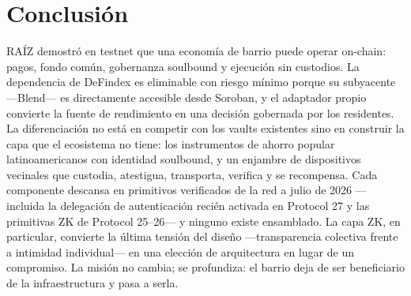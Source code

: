 \documentclass[twocolumn,10pt]{article}
\begin{document}
\section{Conclusi\'on}

RA\'IZ demostr\'o en testnet que una econom\'ia de barrio puede operar on-chain: pagos, fondo com\'un, gobernanza soulbound y ejecuci\'on sin custodios. La dependencia de DeFindex es eliminable con riesgo m\'inimo porque su subyacente ---Blend--- es directamente accesible desde Soroban, y el adaptador propio convierte la fuente de rendimiento en una decisi\'on gobernada por los residentes. La diferenciaci\'on no est\'a en competir con los vaults existentes sino en construir la capa que el ecosistema no tiene: los instrumentos de ahorro popular latinoamericanos con identidad soulbound, y un enjambre de dispositivos vecinales que custodia, atestigua, transporta, verifica y se recompensa. Cada componente descansa en primitivos verificados de la red a julio de 2026 ---incluida la delegaci\'on de autenticaci\'on reci\'en activada en Protocol 27 y las primitivas ZK de Protocol 25--26--- y ninguno existe ensamblado. La capa ZK, en particular, convierte la \'ultima tensi\'on del dise\~no ---transparencia colectiva frente a intimidad individual--- en una elecci\'on de arquitectura en lugar de un compromiso. La misi\'on no cambia; se profundiza: el barrio deja de ser beneficiario de la infraestructura y pasa a serla.
\end{document}
